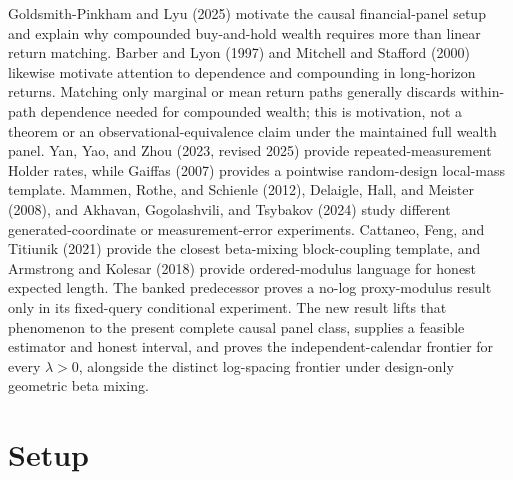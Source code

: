 \documentclass{article}
\begin{document}
Goldsmith-Pinkham and Lyu (2025) motivate the causal financial-panel setup and explain why compounded buy-and-hold wealth requires more than linear return matching. Barber and Lyon (1997) and Mitchell and Stafford (2000) likewise motivate attention to dependence and compounding in long-horizon returns. Matching only marginal or mean return paths generally discards within-path dependence needed for compounded wealth; this is motivation, not a theorem or an observational-equivalence claim under the maintained full wealth panel. Yan, Yao, and Zhou (2023, revised 2025) provide repeated-measurement Holder rates, while Gaiffas (2007) provides a pointwise random-design local-mass template. Mammen, Rothe, and Schienle (2012), Delaigle, Hall, and Meister (2008), and Akhavan, Gogolashvili, and Tsybakov (2024) study different generated-coordinate or measurement-error experiments. Cattaneo, Feng, and Titiunik (2021) provide the closest beta-mixing block-coupling template, and Armstrong and Kolesar (2018) provide ordered-modulus language for honest expected length. The banked predecessor proves a no-log proxy-modulus result only in its fixed-query conditional experiment. The new result lifts that phenomenon to the present complete causal panel class, supplies a feasible estimator and honest interval, and proves the independent-calendar frontier for every \(\lambda>0\), alongside the distinct log-spacing frontier under design-only geometric beta mixing.

\section{Setup}
\end{document}
